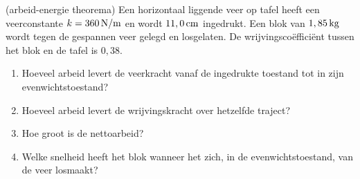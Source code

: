 \documentclass{ximera}
\begin{document}
	\begin{exercise}(arbeid-energie theorema)
	Een horizontaal liggende veer op tafel heeft een veerconstante $k=360\rm\,N/m$ en wordt $11,0\rm\,cm$ ingedrukt. Een blok van $1,85\rm\,kg$ wordt tegen de gespannen veer gelegd en losgelaten. De wrijvingsco\"effici\"ent tussen het blok en de tafel is $0,38$.
	\begin{enumerate}
	\item Hoeveel arbeid levert de veerkracht vanaf de ingedrukte toestand tot in zijn evenwichtstoestand?
	\item Hoeveel arbeid levert de wrijvingskracht over hetzelfde traject?
	\item Hoe groot is de nettoarbeid?
	\item Welke snelheid heeft het blok wanneer het zich, in de evenwichtstoestand, van de veer losmaakt?
	\end{enumerate}
	\end{exercise}
	
	
	
	
\end{document}
